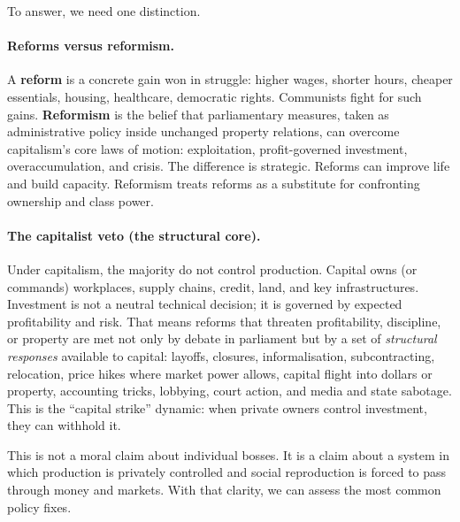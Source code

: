 To answer, we need one distinction.

\paragraph{Reforms versus reformism.}
A \textbf{reform} is a concrete gain won in struggle: higher wages, shorter hours, cheaper essentials, housing,
healthcare, democratic rights. Communists fight for such gains. \textbf{Reformism} is the belief that parliamentary
measures, taken as administrative policy inside unchanged property relations, can overcome capitalism's core laws
of motion: exploitation, profit-governed investment, overaccumulation, and crisis. The difference is strategic.
Reforms can improve life and build capacity. Reformism treats reforms as a substitute for confronting ownership
and class power.

\paragraph{The capitalist veto (the structural core).}
Under capitalism, the majority do not control production. Capital owns (or commands) workplaces, supply chains,
credit, land, and key infrastructures. Investment is not a neutral technical decision; it is governed by expected
profitability and risk. That means reforms that threaten profitability, discipline, or property are met not only
by debate in parliament but by a set of \emph{structural responses} available to capital: layoffs, closures,
informalisation, subcontracting, relocation, price hikes where market power allows, capital flight into dollars or
property, accounting tricks, lobbying, court action, and media and state sabotage. This is the ``capital strike''
dynamic: when private owners control investment, they can withhold it.

This is not a moral claim about individual bosses. It is a claim about a system in which production is privately
controlled and social reproduction is forced to pass through money and markets. With that clarity, we can assess
the most common policy fixes.


